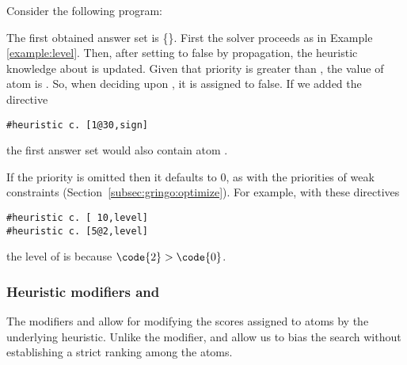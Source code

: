 \begin{example}
\label{example:priority}
Consider the following program:

The first obtained answer set is \mbox{\{\}}.
First the solver proceeds as in Example \ref{example:level}. 
Then, after setting  to false by propagation, 
the heuristic knowledge about  is updated.
Given that priority  is greater than ,
the  value of atom  is .
So, when deciding upon , it is assigned to false.
If we added the directive
\begin{lstlisting}[numbers=none]
#heuristic c. [1@30,sign]
\end{lstlisting}
the first answer set would also contain atom .
\end{example}

\begin{note}
If the priority is omitted then it defaults to $0$,
as with the priorities of weak constraints
(Section~\ref{subsec:gringo:optimize}).
For example,
with these directives
\begin{lstlisting}[numbers=none]
#heuristic c. [ 10,level]
#heuristic c. [5@2,level]
\end{lstlisting}
the level of  is  because $\code{2}>\code{0}$.
\end{note}

\subsubsection{Heuristic modifiers  and }

The modifiers  and  allow for modifying the scores assigned to atoms by the underlying  heuristic.
Unlike the  modifier, 
 and  allow us to bias the search without establishing a strict ranking among the atoms.

